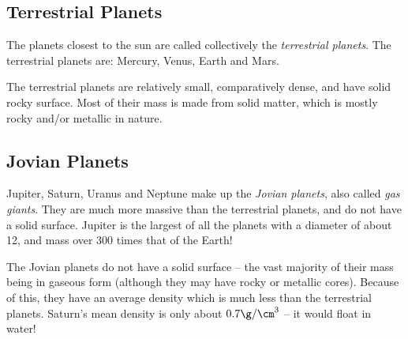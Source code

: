 \subsection{Terrestrial Planets}%

The planets closest to the sun are called collectively the
\emph{terrestrial planets}. The terrestrial planets are: Mercury, Venus,
Earth and Mars.

The terrestrial planets are relatively small, comparatively dense, and
have solid rocky surface. Most of their mass is made from solid matter,
which is mostly rocky and/or metallic in nature.

\subsection{Jovian Planets}%

Jupiter, Saturn, Uranus and Neptune make up the \emph{Jovian planets},
also called \emph{gas giants}. They are much more massive than the
terrestrial planets, and do not have a solid surface. Jupiter is the
largest of all the planets with a diameter of about 12, and mass over
300 times that of the Earth!

The Jovian planets do not have a solid surface -- the vast majority of
their mass being in gaseous form (although they may have rocky or
metallic cores). Because of this, they have an average density which is
much less than the terrestrial planets. Saturn's mean density is only
about $0.7 \g/\cm^3$ -- it would float in water!

